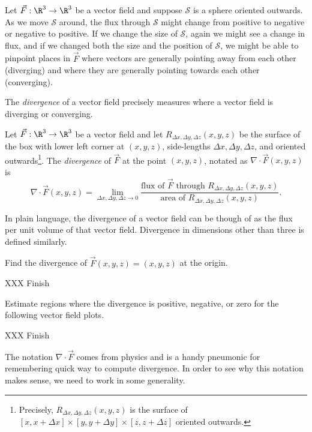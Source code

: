 Let $\vec F:\R^3\to\R^3$ be a vector field and suppose $\mathcal S$ is a 
sphere oriented outwards.  As we move $\mathcal S$ around,
the flux through $\mathcal S$ might change from positive to negative or negative to positive.
If we change the size of $\mathcal S$, again we might see a change in flux, and if
we changed both the size and the position of $\mathcal S$, we might be able to pinpoint
places in $\vec F$ where vectors are generally pointing away from each other (diverging)
and where they are generally pointing towards each other (converging).


The \emph{divergence} of a vector field precisely measures
where a vector field is diverging or converging.  

\begin{definition}[Divergence]
	Let $\vec F:\R^3\to\R^3$ be a vector field and let $R_{\Delta x,\Delta y,\Delta z}(x,y,z)$
	be the surface of the box with lower left corner at $(x,y,z)$,
	side-lengths $\Delta x,\Delta y,\Delta z$,
	and oriented outwards\footnote{ Precisely, $R_{\Delta x,\Delta y,\Delta z}(x,y,z)$
	is the surface of  $[x,x+\Delta x]\times[y,y+\Delta y]\times[z,z+\Delta z]$ oriented outwards.}.
	The \emph{divergence} of $\vec F$ at the point $(x,y,z)$, notated as $\nabla \cdot \vec F(x,y,z)$
	is
	\[
		\nabla \cdot \vec F(x,y,z) = \lim_{\Delta x,\Delta y,\Delta z\to 0}
		\frac{\text{flux of }\vec F\text{ through }R_{\Delta x,\Delta y,\Delta z}(x,y,z)}
		{\text{area of }
		R_{\Delta x,\Delta y,\Delta z}(x,y,z)}.
	\]
\end{definition}

In plain language, the divergence of a vector field can be though of as the flux per unit volume
of that vector field.  Divergence in dimensions other than three is defined similarly.

\begin{example}
	Find the divergence of $\vec F(x,y,z)=(x,y,z)$ at the origin.

	XXX Finish
\end{example}

\begin{example}
	Estimate regions where the divergence is positive, negative, or zero
	for the following vector field plots.

	XXX Finish
\end{example}

The notation $\nabla \cdot \vec F$ comes from physics and is a handy pneumonic
for remembering quick way to compute divergence.  In order to see why this notation
makes sense, we need to work in some generality.

